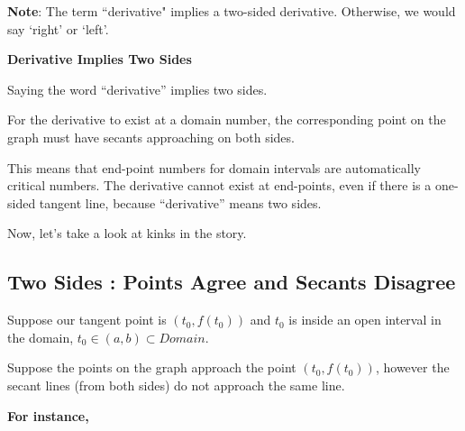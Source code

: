 \documentclass{ximera}
\begin{document}
\textbf{Note}: The term ``derivative" implies a two-sided derivative.  Otherwise, we would say `right' or `left'. 




\begin{warning} \textbf{\textcolor{red!70!black}{Derivative Implies Two Sides}}

Saying the word ``derivative'' implies two sides. 

For the derivative to exist at a domain number, the corresponding point on the graph must have secants approaching on both sides. 


This means that end-point numbers for domain intervals are automatically critical numbers.  The derivative cannot exist at end-points, even if there is a one-sided tangent line, because ``derivative'' means two sides. 

\end{warning}




















Now, let's take a look at kinks in the story. 





















\subsection*{Two Sides : Points Agree and Secants Disagree}


Suppose our tangent point is $(t_0 , f(t_0))$ and $t_0$ is inside an open interval in the domain, $t_0 \in (a, b) \subset Domain$. 


Suppose the points on the graph approach the point $(t_0 , f(t_0))$, however the secant lines (from both sides) do not approach the same line.



\textbf{For instance,}  
\end{document}
